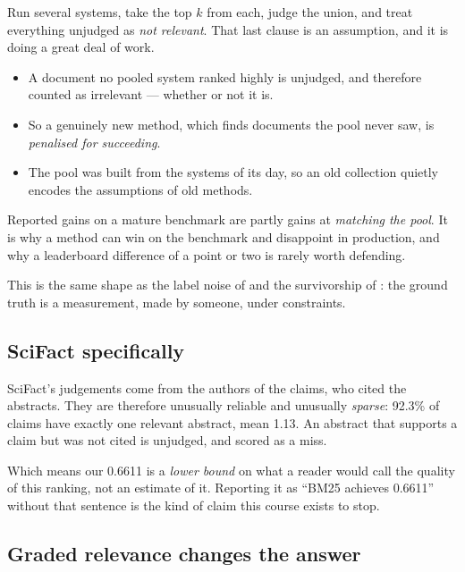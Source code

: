\documentclass[11pt,a4paper]{article}
\begin{document}
\begin{keybox}[title={Pooling}]
Run several systems, take the top $k$ from each, judge the union, and treat
everything unjudged as \emph{not relevant}. That last clause is an assumption,
and it is doing a great deal of work.
\end{keybox}

\begin{failbox}[title={Failure condition --- what pooling misses}]
\begin{itemize}[leftmargin=*,nosep]
  \item A document no pooled system ranked highly is unjudged, and therefore
        counted as irrelevant --- whether or not it is.
  \item So a genuinely new method, which finds documents the pool never saw, is
        \emph{penalised for succeeding}.
  \item The pool was built from the systems of its day, so an old collection
        quietly encodes the assumptions of old methods.
\end{itemize}
Reported gains on a mature benchmark are partly gains at \emph{matching the
pool}. It is why a method can win on the benchmark and disappoint in
production, and why a leaderboard difference of a point or two is rarely worth
defending.
\end{failbox}

This is the same shape as the label noise of  and the survivorship
of : the ground truth is a measurement, made by someone, under
constraints.

\subsection{SciFact specifically}

SciFact's judgements come from the authors of the claims, who cited the
abstracts. They are therefore unusually reliable and unusually \emph{sparse}:
92.3\% of claims have exactly one relevant abstract, mean 1.13. An abstract
that supports a claim but was not cited is unjudged, and scored as a miss.

Which means our 0.6611 is a \emph{lower bound} on what a reader would call the
quality of this ranking, not an estimate of it. Reporting it as ``BM25 achieves
0.6611'' without that sentence is the kind of claim this course exists to stop.

\subsection{Graded relevance changes the answer}
\end{document}
